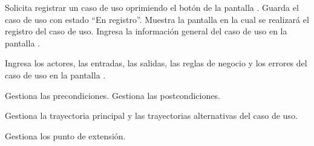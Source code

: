  \begin{UCtrayectoria}
    \UCpaso[\UCactor] Solicita registrar un caso de uso oprimiendo el botón  de la pantalla .
    \UCpaso[\UCsist] Guarda el caso de uso con estado ``En registro''.
    \UCpaso[\UCsist] Muestra la pantalla  en la cual se realizará el registro del caso de uso. 
    \UCpaso[\UCactor] Ingresa la información general del caso de uso en la pantalla . 
    
    \UCpaso[\UCactor] Ingresa los actores, las entradas, las salidas, las reglas de negocio y los errores del caso de uso en la pantalla .\label{cu5.1:ingresaDatos}
    
    \UCpaso[\UCactor] Gestiona las precondiciones.\label{cu5.1:ingresaPrecond}
    \UCpaso[\UCactor] Gestiona las postcondiciones.\label{cu5.1:ingresaPostcond}
    
    \UCpaso[\UCactor] Gestiona la trayectoria principal y las trayectorias alternativas del caso de uso.  \label{cu5.1:ingresaTrayP}

    \UCpaso[\UCactor] Gestiona los punto de extensión. \label{cu5.1:ingresaPE}
    

\end{UCtrayectoria}
